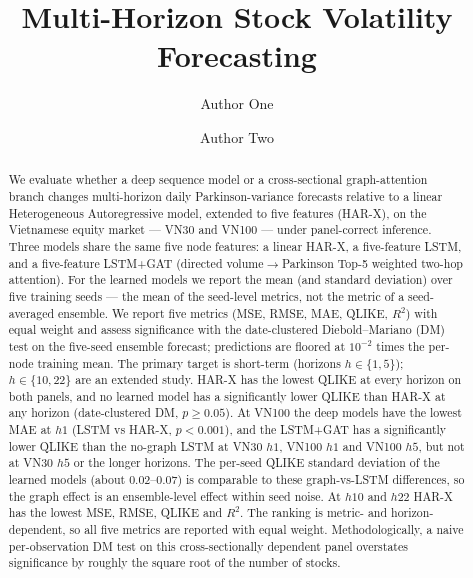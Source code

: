 \documentclass[runningheads]{llncs}
\begin{document}
\title{Multi-Horizon Stock Volatility Forecasting}

\author{Author One \and Author Two}

\maketitle

\begin{abstract}
We evaluate whether a deep sequence model or a cross-sectional graph-attention branch changes multi-horizon
daily Parkinson-variance forecasts relative to a linear Heterogeneous Autoregressive model, extended to five features (HAR-X), on the
Vietnamese equity market --- VN30 and VN100 --- under panel-correct inference.
Three models share the same five node features: a linear HAR-X, a
five-feature LSTM, and a five-feature LSTM+GAT (directed volume$\to$Parkinson Top-5 weighted two-hop
attention). For the learned models we report the mean (and standard deviation) over five training seeds ---
the mean of the seed-level metrics, not the metric of a seed-averaged ensemble. We report five metrics (MSE,
RMSE, MAE, QLIKE, $R^2$) with equal weight and assess significance with the date-clustered Diebold--Mariano
(DM) test on the five-seed ensemble forecast; predictions are floored at $10^{-2}$ times the per-node training
mean. The primary target is short-term (horizons $h\in\{1,5\}$); $h\in\{10,22\}$ are an extended study. HAR-X
has the lowest QLIKE at every horizon on both panels, and no learned model has a significantly lower QLIKE than
HAR-X at any horizon (date-clustered DM, $p\ge0.05$). At VN100 the deep models have the lowest MAE at $h1$
(LSTM vs HAR-X, $p<0.001$), and the LSTM+GAT has a significantly lower QLIKE than the no-graph LSTM at VN30
$h1$, VN100 $h1$ and VN100 $h5$, but not at VN30 $h5$ or the longer horizons. The per-seed QLIKE standard
deviation of the learned models (about $0.02$--$0.07$) is comparable to these graph-vs-LSTM differences, so the
graph effect is an ensemble-level effect within seed noise. At $h10$ and $h22$ HAR-X has the lowest MSE, RMSE,
QLIKE and $R^2$. The ranking is metric- and horizon-dependent, so all five metrics are reported with equal
weight. Methodologically, a naive per-observation DM test on this cross-sectionally dependent panel overstates
significance by roughly the square root of the number of stocks.
\end{abstract}
\end{document}
